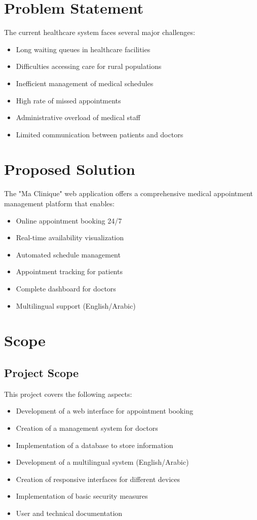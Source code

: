 \documentclass[12pt,a4paper]{report}
\begin{document}
\section{Problem Statement}

The current healthcare system faces several major challenges:
\begin{itemize}
    \item Long waiting queues in healthcare facilities
    \item Difficulties accessing care for rural populations
    \item Inefficient management of medical schedules
    \item High rate of missed appointments
    \item Administrative overload of medical staff
    \item Limited communication between patients and doctors
\end{itemize}

\section{Proposed Solution}

The "Ma Clinique" web application offers a comprehensive medical appointment management platform that enables:
\begin{itemize}
    \item Online appointment booking 24/7
    \item Real-time availability visualization
    \item Automated schedule management
    \item Appointment tracking for patients
    \item Complete dashboard for doctors
    \item Multilingual support (English/Arabic)
\end{itemize}

\section{Scope}

\subsection{Project Scope}
This project covers the following aspects:
\begin{itemize}
    \item Development of a web interface for appointment booking
    \item Creation of a management system for doctors
    \item Implementation of a database to store information
    \item Development of a multilingual system (English/Arabic)
    \item Creation of responsive interfaces for different devices
    \item Implementation of basic security measures
    \item User and technical documentation
\end{itemize}
\end{document}
